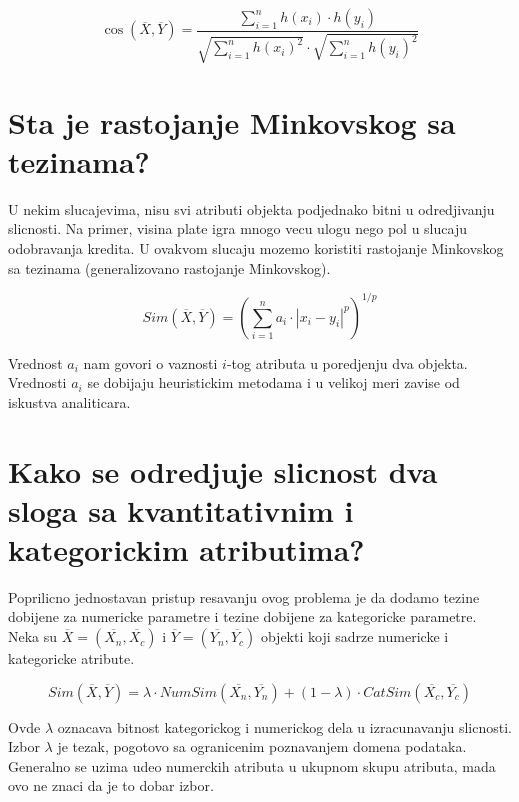 \documentclass[a4paper]{article}
\begin{document}
\[
    \cos(\overline{X}, \overline{Y}) =
    \dfrac{\sum_{i=1}^{n} h(x_i) \cdot h(y_i)}{\sqrt{\sum_{i=1}^{n} h(x_i)^2} \cdot
        \sqrt{\sum_{i=1}^{n} h(y_i)^2}}
\]


\section{Sta je rastojanje Minkovskog sa tezinama?}

U nekim slucajevima, nisu svi atributi objekta podjednako bitni u odredjivanju slicnosti. Na primer,
visina plate igra mnogo vecu ulogu nego pol u slucaju odobravanja kredita. U ovakvom slucaju mozemo
koristiti rastojanje Minkovskog sa tezinama (generalizovano rastojanje Minkovskog).

\[
    Sim(\overline{X}, \overline{Y}) = \left(\sum_{i=1}^{n} a_i \cdot |x_i - y_i|^p\right)^{1/p}
\]

Vrednost \(a_i\) nam govori o vaznosti \(i\)-tog atributa u poredjenju dva
objekta. Vrednosti \(a_i\) se dobijaju heuristickim metodama i u velikoj meri zavise od iskustva
analiticara.

\section{Kako se odredjuje slicnost dva sloga sa kvantitativnim i kategorickim atributima?}

Poprilicno jednostavan pristup resavanju ovog problema je da dodamo tezine dobijene za numericke
parametre i tezine dobijene za kategoricke parametre. Neka su
\(\overline{X}=(\overline{X_n}, \overline{X_c})\) i \(\overline{Y}=(\overline{Y_n}, \overline{Y_c})\)
objekti koji sadrze numericke i kategoricke atribute.

\[
    Sim(\overline{X}, \overline{Y}) =
        \lambda \cdot NumSim(\overline{X_n}, \overline{Y_n})
        + (1 - \lambda) \cdot CatSim(\overline{X_c}, \overline{Y_c})
\]

Ovde \(\lambda\) oznacava bitnost kategorickog i numerickog dela u izracunavanju slicnosti. Izbor
\(\lambda\) je tezak, pogotovo sa ogranicenim poznavanjem domena podataka. Generalno se uzima udeo
numerckih atributa u ukupnom skupu atributa, mada ovo ne znaci da je to dobar izbor.
\end{document}
